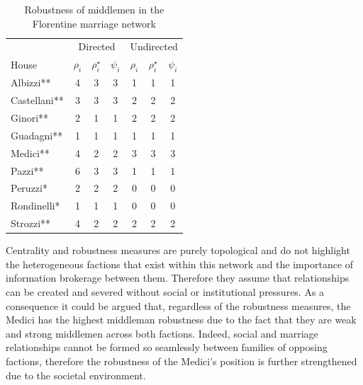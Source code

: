 \documentclass[11pt,fleqn]{article}
\begin{document}
\begin{table}
\centering
\begin{tabular}{|l|ccc|ccc|}
\toprule
  & \multicolumn{3}{|c|}{Directed}   & \multicolumn{3}{|c|}{Undirected}      \\
House   & $\rho_{i}$ & $\rho^{\star}_{i}$ & $\psi_{i}$ & $\rho_{i}$ & $\rho^{\star}_{i}$ & $\psi_{i}$ \\
\midrule
Albizzi**    & 4            & 3           & 3            & 1            & 1           & 1            \\
Castellani** & 3            & 3           & 3            & 2            & 2           & 2            \\
Ginori**     & 2            & 1           & 1            & 2            & 2           & 2            \\
Guadagni**   & 1            & 1           & 1            & 1            & 1           & 1            \\
Medici**     & 4            & 2           & 2            & 3            & 3           & 3            \\
Pazzi**      & 6            & 3           & 3            & 1            & 1           & 1            \\
Peruzzi*     & 2            & 2           & 2            & 0            & 0           & 0            \\
Rondinelli*  & 1            & 1           & 1            & 0            & 0           & 0            \\
Strozzi**    & 4            & 2           & 2            & 2            & 2           & 2            \\
\bottomrule
\end{tabular}
\caption{Robustness of middlemen in the Florentine marriage network}
\label{FlorenceRobust}
\end{table}

\medskip \noindent Centrality and robustness measures are purely topological and do not highlight the heterogeneous factions that exist within this network and the importance of information brokerage between them. Therefore they assume that relationships can be created and severed without social or institutional pressures. As a consequence it could be argued that, regardless of the robustness measures, the Medici has the highest middleman robustness due to the fact that they are weak and strong middlemen across both factions. Indeed, social and marriage relationships cannot be formed so seamlessly between families of opposing factions, therefore the robustness of the Medici's position is further strengthened due to the societal environment.
\end{document}
